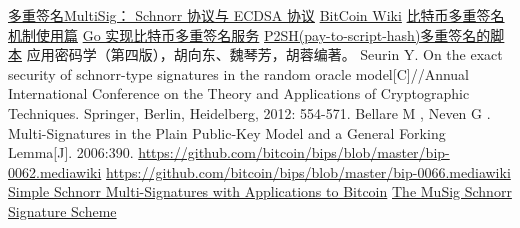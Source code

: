 \documentclass[a4paper,10pt]{article}
\begin{document}
\begin{thebibliography}{99}
   \href{https://zhuanlan.zhihu.com/p/108531622}{多重签名MultiSig： Schnorr 协议与 ECDSA 协议}
   \href{https://en.bitcoin.it/wiki/Multisignature}{BitCoin Wiki}
   \href{https://www.wanbizu.com/baike/201408191710.html}{比特币多重签名机制使用篇}
   \href{https://www.jianshu.com/p/21107f737b98}{Go 实现比特币多重签名服务}
   \href{https://www.cnblogs.com/itlgl/p/10419325.html}{P2SH(pay-to-script-hash)多重签名的脚本}
   应用密码学（第四版），胡向东、魏琴芳，胡蓉编著。
   Seurin Y. On the exact security of schnorr-type signatures in the random oracle model[C]//Annual International Conference on the Theory and Applications of Cryptographic Techniques. Springer, Berlin, Heidelberg, 2012: 554-571.
   Bellare M , Neven G . Multi-Signatures in the Plain Public-Key Model and a General Forking Lemma[J]. 2006:390.
   \url{https://github.com/bitcoin/bips/blob/master/bip-0062.mediawiki}
   \url{https://github.com/bitcoin/bips/blob/master/bip-0066.mediawiki}
   \href{https://eprint.iacr.org/2018/068.pdf}{Simple Schnorr Multi-Signatures
  with Applications to Bitcoin}
   \href{https://tlu.tarilabs.com/cryptography/musig-schnorr-sig-scheme/The_MuSig_Schnorr_Signature_Scheme.html#introduction}{The MuSig Schnorr Signature Scheme}
\end{thebibliography}
\end{document}
